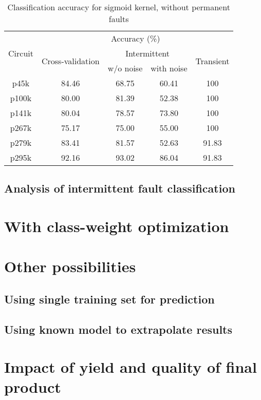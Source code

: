 \begin{table}[h]

	\captionsetup{justification=centering}
\begin{tabular}{ccccc}
\hline
\multirow{3}{*}{Circuit} & \multicolumn{4}{c}{Accuracy (\%)}                                                                 \\ \cline{2-5} 
                         & \multirow{2}{*}{Cross-validation} & \multicolumn{2}{c}{Intermittent} & \multirow{2}{*}{Transient} \\ \cline{3-4}
                         &                                   & w/o noise      & with noise      &                            \\ \hline
p45k                     & 84.46                             & 68.75          & 60.41           & 100                        \\
p100k                    & 80.00                             & 81.39          & 52.38           & 100                        \\
p141k                    & 80.04                             & 78.57          & 73.80           & 100                        \\
p267k                    & 75.17                             & 75.00          & 55.00           & 100                        \\
p279k                    & 83.41                             & 81.57          & 52.63           & 91.83                      \\
p295k                    & 92.16                             & 93.02          & 86.04           & 91.83                     \\
\hline
\end{tabular}
\caption {Classification accuracy for sigmoid kernel, without permanent faults}
\label{tab:sigwop}
\end{table}

\subsection{Analysis of intermittent fault classification}
\section{With class-weight optimization}
\section{Other possibilities}
\subsection{Using single training set for prediction}
\subsection{Using known model to extrapolate results}
\section{Impact of yield and quality of final product}
